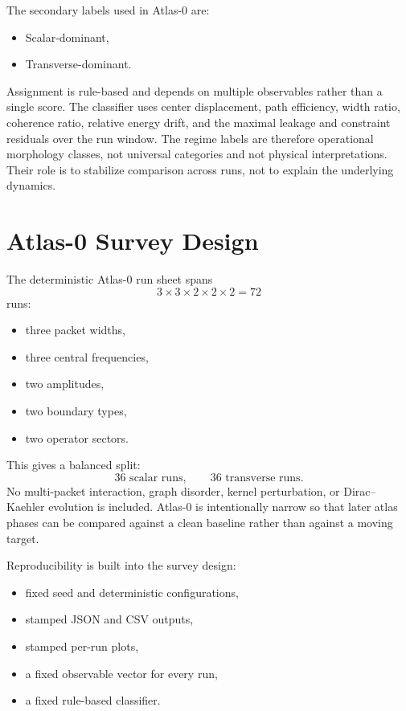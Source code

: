 \documentclass[11pt]{article}
\begin{document}
The secondary labels used in Atlas-0 are:
\begin{itemize}
\item Scalar-dominant,
\item Transverse-dominant.
\end{itemize}

Assignment is rule-based and depends on multiple observables rather than a single score. The classifier uses center displacement, path efficiency, width ratio, coherence ratio, relative energy drift, and the maximal leakage and constraint residuals over the run window. The regime labels are therefore operational morphology classes, not universal categories and not physical interpretations. Their role is to stabilize comparison across runs, not to explain the underlying dynamics.

\section{Atlas-0 Survey Design}
The deterministic Atlas-0 run sheet spans
\begin{equation}
3 \times 3 \times 2 \times 2 \times 2 = 72
\end{equation}
runs:
\begin{itemize}
\item three packet widths,
\item three central frequencies,
\item two amplitudes,
\item two boundary types,
\item two operator sectors.
\end{itemize}

This gives a balanced split:
\begin{equation}
36 \text{ scalar runs}, \qquad 36 \text{ transverse runs}.
\end{equation}
No multi-packet interaction, graph disorder, kernel perturbation, or Dirac--Kaehler evolution is included. Atlas-0 is intentionally narrow so that later atlas phases can be compared against a clean baseline rather than against a moving target.

Reproducibility is built into the survey design:
\begin{itemize}
\item fixed seed and deterministic configurations,
\item stamped JSON and CSV outputs,
\item stamped per-run plots,
\item a fixed observable vector for every run,
\item a fixed rule-based classifier.
\end{itemize}
\end{document}
